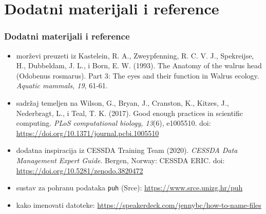 \documentclass[aspectratio=169]{beamer}
\newenvironment{noheadline}{
    \setbeamertemplate{headline}{}
}{}
\begin{document}
\section{Dodatni materijali i reference}

\begin{noheadline}
    \begin{frame}
        \frametitle{Dodatni materijali i reference}

        \fontsize{10}{12}\selectfont

        \begin{itemize}
            \setlength{\itemsep}{1em}
            
            \item morževi preuzeti iz Kastelein, R. A., Zweypfenning, R. C. V.
                J., Spekreijse, H., Dubbeldam, J. L., i Born, E. W. (1993). The
                Anatomy of the walrus head (Odobenus rosmarus). Part 3: The eyes
                and their function in Walrus ecology. \textit{Aquatic mammals, 19},
                61-61.

            \item sadržaj temeljen na Wilson, G., Bryan, J., Cranston, K.,
                Kitzes, J., Nederbragt, L., i Teal, T. K. (2017). Good enough
                practices in scientific computing. \textit{PLoS computational biology,
                13}(6), e1005510. doi: \url{https://doi.org/10.1371/journal.pcbi.1005510}

            \item dodatna inspiracija iz CESSDA Training Team (2020). \textit{CESSDA
                Data Management Expert Guide}. Bergen, Norway: CESSDA ERIC. doi:
                \url{https://doi.org/10.5281/zenodo.3820472}

            \item sustav za pohranu podataka \texttt{puh} (Srce):
                \url{https://www.srce.unizg.hr/puh}

            \item kako imenovati datoteke:
                \url{https://speakerdeck.com/jennybc/how-to-name-files}
            
        \end{itemize}
    \end{frame}
\end{noheadline}
\end{document}
